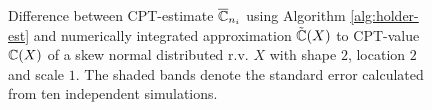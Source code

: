 \begin{figure}
    \centering
{}
			\caption{Difference between CPT-estimate $\overline {\mathbb{C}}_{n_i}$ using Algorithm \ref{alg:holder-est} and numerically integrated approximation $\tilde {\mathbb{C}}(X)$ to CPT-value $\mathbb{C}(X)$ of a skew normal distributed r.v. $X$ with shape $2$, location $2$ and scale $1$. The shaded bands denote the standard error calculated from ten independent simulations.  }
      \label{fig:cpt-est} 
			\end{figure}
